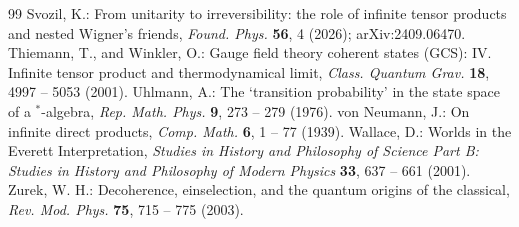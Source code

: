 \documentclass[twoside,11pt,letter]{article}
\theoremstyle{definition}
\theoremstyle{definition}
\theoremstyle{plain}
\begin{document}
\begin{thebibliography}{99}
 Svozil, K.: From unitarity to irreversibility: the role of infinite tensor products and nested Wigner's friends, \textit{Found. Phys.} \textbf{56}, 4 (2026); arXiv:2409.06470.
 Thiemann, T., and Winkler, O.: Gauge field theory coherent states (GCS): IV. Infinite tensor product and thermodynamical limit, \textit{Class. Quantum Grav.} \textbf{18}, 4997 -- 5053 (2001).
 Uhlmann, A.: The `transition probability' in the state space of a $^\ast$-algebra, \textit{Rep. Math. Phys.} \textbf{9}, 273 -- 279 (1976).
 von Neumann, J.: On infinite direct products, \textit{Comp. Math.} \textbf{6}, 1 -- 77 (1939).
 Wallace, D.: Worlds in the Everett Interpretation, \textit{Studies in History and Philosophy of Science Part B: Studies in History and Philosophy of Modern Physics} \textbf{33}, 637 -- 661 (2001).
 Zurek, W. H.: Decoherence, einselection, and the quantum origins of the classical, \textit{Rev. Mod. Phys.} \textbf{75}, 715 -- 775 (2003).
\end{thebibliography}
\end{document}
